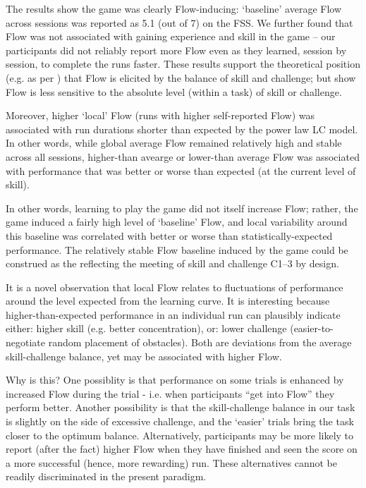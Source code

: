 \documentclass[fleqn,10pt]{wlscirep}
\begin{document}
The results show the game was clearly Flow-inducing: `baseline' average Flow across sessions was reported as 5.1 (out of 7) on the FSS. %
We further found that Flow was not associated with gaining experience and skill in the game -- our participants did not reliably report more Flow even as they learned, session by session, to complete the runs faster. These results support the theoretical position (e.g. as per \cite{Keller2012}) that Flow is elicited by the balance of skill and challenge; but show Flow is less sensitive to the absolute level (within a task) of skill or challenge.

Moreover, higher `local' Flow (runs with higher self-reported Flow) was associated with run durations shorter than expected by the power law LC model. In other words, while global average Flow remained relatively high and stable across all sessions, higher-than avearge or lower-than average Flow was associated with performance that was better or worse than expected (at the current level of skill).

In other words, learning to play the game did not itself increase Flow; rather, the game induced a fairly high level of `baseline' Flow, and local variability around this baseline was correlated with better or worse than statistically-expected performance. The relatively stable Flow baseline induced by the game could be construed as the reflecting the meeting of skill and challenge {\sf C1--3} by design.

It is a novel observation that local Flow relates to fluctuations of performance around the level expected from the learning curve. It is interesting because higher-than-expected performance in an individual run can plausibly indicate either: higher skill (e.g. better concentration), or: lower challenge (easier-to-negotiate random placement of obstacles). Both are deviations from the average skill-challenge balance, yet may be associated with higher Flow.

Why is this? One possiblity is that performance on some trials is enhanced by increased Flow during the trial - i.e. when participants ``get into Flow'' they perform better. Another possibility is that the skill-challenge balance in our task is slightly on the side of excessive challenge, and the `easier' trials bring the task closer to the optimum balance. Alternatively, participants may be more likely to report (after the fact) higher Flow when they have finished and seen the score on a more successful (hence, more rewarding) run. These alternatives cannot be readily discriminated in the present paradigm.
\end{document}
